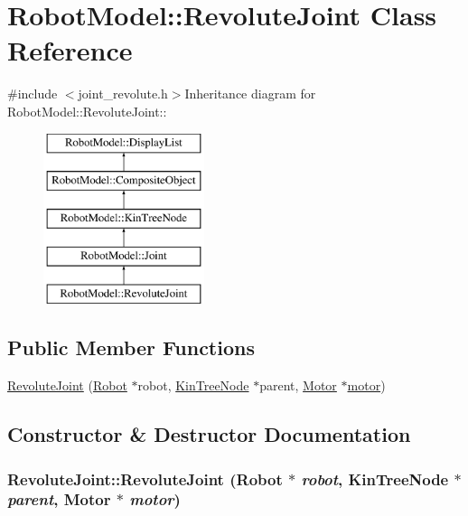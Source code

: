\hypertarget{class_robot_model_1_1_revolute_joint}{
\section{RobotModel::RevoluteJoint Class Reference}
\label{class_robot_model_1_1_revolute_joint}
}


{\ttfamily \#include $<$joint\_\-revolute.h$>$}Inheritance diagram for RobotModel::RevoluteJoint::\begin{figure}[H]
\begin{center}
\leavevmode
\includegraphics[height=5cm]{class_robot_model_1_1_revolute_joint}
\end{center}
\end{figure}
\subsection*{Public Member Functions}
\begin{DoxyCompactItemize}
\item 
\hyperlink{class_robot_model_1_1_revolute_joint_afa148418b3aeabb6294dcb8bdc033208}{RevoluteJoint} (\hyperlink{class_robot_model_1_1_robot}{Robot} $\ast$robot, \hyperlink{class_robot_model_1_1_kin_tree_node}{KinTreeNode} $\ast$parent, \hyperlink{class_robot_model_1_1_motor}{Motor} $\ast$\hyperlink{class_robot_model_1_1_joint_a9fe40b0c9b6562d7a4cce3dd8715f945}{motor})
\end{DoxyCompactItemize}


\subsection{Constructor \& Destructor Documentation}
\hypertarget{class_robot_model_1_1_revolute_joint_afa148418b3aeabb6294dcb8bdc033208}{
\subsubsection[{RevoluteJoint}]{\setlength{\rightskip}{0pt plus 5cm}RevoluteJoint::RevoluteJoint ({\bf Robot} $\ast$ {\em robot}, \/  {\bf KinTreeNode} $\ast$ {\em parent}, \/  {\bf Motor} $\ast$ {\em motor})}}
\label{class_robot_model_1_1_revolute_joint_afa148418b3aeabb6294dcb8bdc033208}


